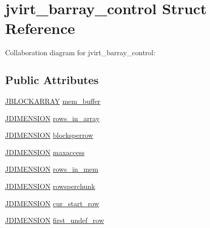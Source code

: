 \hypertarget{structjvirt__barray__control}{}\section{jvirt\+\_\+barray\+\_\+control Struct Reference}
\label{structjvirt__barray__control}


Collaboration diagram for jvirt\+\_\+barray\+\_\+control\+:
\subsection*{Public Attributes}
\begin{DoxyCompactItemize}
\item 
\hyperlink{jpeglib_8h_ab03cfeb937b60b9b73ca6e3cf935af49}{J\+B\+L\+O\+C\+K\+A\+R\+R\+A\+Y} \hyperlink{structjvirt__barray__control_a8afb55dcf60348a5ae746e19315f745e}{mem\+\_\+buffer}
\item 
\hyperlink{jmorecfg_8h_a04ed4674f6f1d0d50ec241531e38274f}{J\+D\+I\+M\+E\+N\+S\+I\+O\+N} \hyperlink{structjvirt__barray__control_a57c1bf0ff557df3e1e0926e367a6b635}{rows\+\_\+in\+\_\+array}
\item 
\hyperlink{jmorecfg_8h_a04ed4674f6f1d0d50ec241531e38274f}{J\+D\+I\+M\+E\+N\+S\+I\+O\+N} \hyperlink{structjvirt__barray__control_a6c148bce80b027c114ec7d37221cd175}{blocksperrow}
\item 
\hyperlink{jmorecfg_8h_a04ed4674f6f1d0d50ec241531e38274f}{J\+D\+I\+M\+E\+N\+S\+I\+O\+N} \hyperlink{structjvirt__barray__control_a47ffc73c735353eaac752145847cfc92}{maxaccess}
\item 
\hyperlink{jmorecfg_8h_a04ed4674f6f1d0d50ec241531e38274f}{J\+D\+I\+M\+E\+N\+S\+I\+O\+N} \hyperlink{structjvirt__barray__control_a23aa025027bba6a29287b1460d72bf71}{rows\+\_\+in\+\_\+mem}
\item 
\hyperlink{jmorecfg_8h_a04ed4674f6f1d0d50ec241531e38274f}{J\+D\+I\+M\+E\+N\+S\+I\+O\+N} \hyperlink{structjvirt__barray__control_ad31f701b81d11db2bd5fa33579d9674e}{rowsperchunk}
\item 
\hyperlink{jmorecfg_8h_a04ed4674f6f1d0d50ec241531e38274f}{J\+D\+I\+M\+E\+N\+S\+I\+O\+N} \hyperlink{structjvirt__barray__control_ae1e7828cda2f39e8ffdd7e0cc4336f76}{cur\+\_\+start\+\_\+row}
\item 
\hyperlink{jmorecfg_8h_a04ed4674f6f1d0d50ec241531e38274f}{J\+D\+I\+M\+E\+N\+S\+I\+O\+N} \hyperlink{structjvirt__barray__control_aa4bba1a9fc9dfdbb43d926f27016bb08}{first\+\_\+undef\+\_\+row}
\item 

\end{DoxyCompactItemize}
